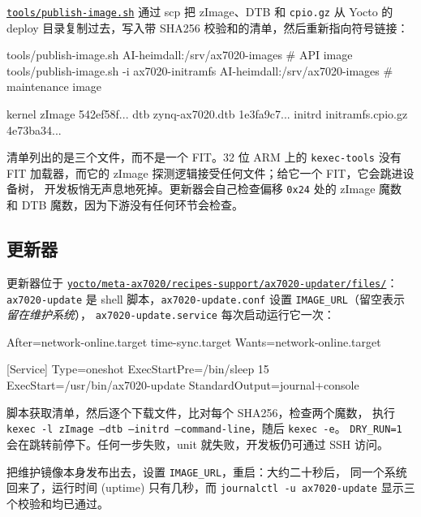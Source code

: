 \documentclass[11pt,a4paper,oneside]{article}
\newcommand{\file}[1]{{\color{bluemid}\nolinkurl{#1}}}
\newcommand{\cmd}[1]{\texttt{#1}}
\newcommand{\repo}{https://github.com/MaxClerkwell/ax7020-bringup}
\newcommand{\rfile}[1]{\href{\repo/blob/master/#1}{\color{bluemid}\nolinkurl{#1}}}
\begin{document}
\rfile{tools/publish-image.sh} 通过 scp 把 zImage、DTB 和 \cmd{cpio.gz} 从 Yocto
的 deploy 目录复制过去，写入带 SHA256 校验和的清单，然后重新指向符号链接：

\begin{shell}
tools/publish-image.sh AI-heimdall:/srv/ax7020-images                  # API image
tools/publish-image.sh -i ax7020-initramfs AI-heimdall:/srv/ax7020-images   # maintenance image
\end{shell}

\begin{code}
kernel zImage             542ef58f...
dtb    zynq-ax7020.dtb    1e3fa9c7...
initrd initramfs.cpio.gz  4e73ba34...
\end{code}

\begin{mustknow}
清单列出的是三个文件，而不是一个 FIT。32 位 ARM 上的 \cmd{kexec-tools} 没有 FIT
加载器，而它的 zImage 探测逻辑接受任何文件；给它一个 FIT，它会跳进设备树，
开发板悄无声息地死掉。更新器会自己检查偏移 \cmd{0x24} 处的 zImage 魔数
和 DTB 魔数，因为下游没有任何环节会检查。
\end{mustknow}

\subsection{更新器}

更新器位于 \rfile{yocto/meta-ax7020/recipes-support/ax7020-updater/files/}：
\file{ax7020-update} 是 shell 脚本，\file{ax7020-update.conf} 设置
\cmd{IMAGE\_URL}（留空表示\emph{留在维护系统}），
\file{ax7020-update.service} 每次启动运行它一次：

\begin{code}
[Unit]
After=network-online.target time-sync.target
Wants=network-online.target

[Service]
Type=oneshot
ExecStartPre=/bin/sleep 15
ExecStart=/usr/bin/ax7020-update
StandardOutput=journal+console
\end{code}

脚本获取清单，然后逐个下载文件，比对每个 SHA256，检查两个魔数，
执行 \cmd{kexec -l zImage --dtb --initrd --command-line}，随后 \cmd{kexec -e}。
\cmd{DRY\_RUN=1} 会在跳转前停下。任何一步失败，unit 就失败，开发板仍可通过
SSH 访问。

\begin{checkpoint}
把维护镜像本身发布出去，设置 \cmd{IMAGE\_URL}，重启：大约二十秒后，
同一个系统回来了，运行时间 (uptime) 只有几秒，而
\cmd{journalctl -u ax7020-update} 显示三个校验和均已通过。
\end{checkpoint}
\end{document}
